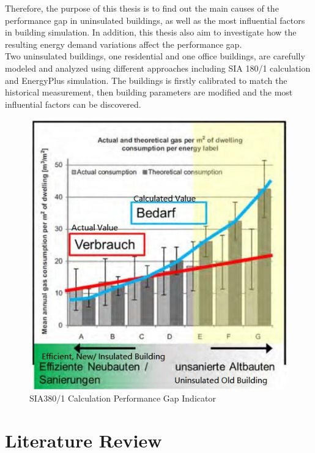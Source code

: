\documentclass[11pt, a4paper]{article}
\theoremstyle{definition}
\begin{document}
	
		Therefore, the purpose of this thesis is to find out the main causes of the performance gap in uninsulated buildings, as well as the most influential factors in building simulation. In addition, this thesis also aim to investigate how the resulting energy demand variations affect the performance gap.\\

	
		Two uninsulated buildings, one residential and one office buildings, are carefully modeled and analyzed using different approaches including SIA 180/1 calculation and EnergyPlus simulation. The buildings is firstly calibrated to match the historical measurement, then building parameters are modified and the most influential factors can be discovered.

			\begin{figure}[h!]
			\centering
			\includegraphics[scale=0.65]{Figure/SIA380Issue.jpg}
			\caption{SIA380/1 Calculation Performance Gap Indicator \cite{SIAPreviousreport}}
			\label{fig:SIA380PG}
			\end{figure}


\newpage		
\section{Literature Review}
\end{document}
